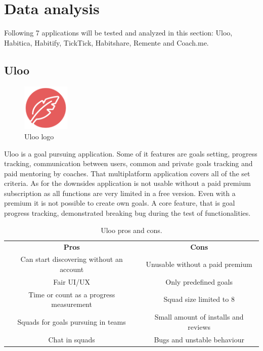 \section{Data analysis}\label{sec:data-analysis}

Following 7 applications will be tested and analyzed in this section: Uloo, Habitica, Habitify, TickTick, Habitshare, Remente and Coach.me.

\subsection{Uloo}\label{subsec:uloo}

\begin{figure}[h!]
    \includegraphics[width=0.20\textwidth]{images/uloo-logo.png}
    \caption{Uloo logo~\cite{uloo-logo}}
    \label{fig:uloo-logo}
\end{figure}

Uloo is a goal pursuing application.
Some of it features are goals setting, progress tracking, communication between users, common and private goals tracking and paid mentoring by coaches.
That multiplatform application covers all of the set criteria.
As for the downsides application is not usable without a paid premium subscription as all functions are very limited in a free version.
Even with a premium it is not possible to create own goals.
A core feature, that is goal progress tracking, demonstrated breaking bug during the test of functionalities.

\begin{table}[h!]
    \centering
    \begin{adjustbox}{width=\textwidth}
        \begin{ctucolortab}
            \begin{tabular}{cc}
                \bfseries Pros & \bfseries Cons\\\Midrule
                Can start discovering without an account & Unusable without a paid premium\\
                Fair UI/UX & Only predefined goals\\
                Time or count as a progress measurement & Squad size limited to 8\\
                Squads for goals pursuing in teams & Small amount of installs and reviews\\
                Chat in squads & Bugs and unstable behaviour\\
            \end{tabular}
        \end{ctucolortab}
    \end{adjustbox}
    \caption{Uloo pros and cons.}\label{tab:uloo-pros-cons}
\end{table}

